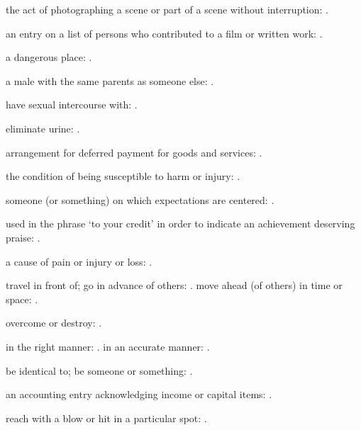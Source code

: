   the act of photographing a scene or part of a scene without interruption: .

  an entry on a list of persons who contributed to a film or written work: .

  a dangerous place:   .

  a male with the same parents as someone else:   .

  have sexual intercourse with: .

  eliminate urine:   .

  arrangement for deferred payment for goods and services:   .

  the condition of being susceptible to harm or injury:   .

  someone (or something) on which expectations are centered: .

  used in the phrase `to your credit' in order to indicate an achievement deserving praise: .

  a cause of pain or injury or loss:   .

  travel in front of; go in advance of others:   . move ahead (of others) in time or space:   .

  overcome or destroy: .

  in the right manner:   . in an accurate manner:   .

  be identical to; be someone or something: .

  an accounting entry acknowledging income or capital items:   .

  reach with a blow or hit in a particular spot:   .

